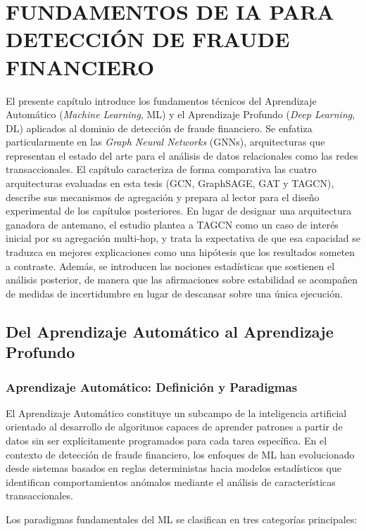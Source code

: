 \chapter{FUNDAMENTOS DE IA PARA DETECCIÓN DE FRAUDE FINANCIERO}

El presente capítulo introduce los fundamentos técnicos del Aprendizaje Automático (\textit{Machine Learning}, ML) y el Aprendizaje Profundo (\textit{Deep Learning}, DL) aplicados al dominio de detección de fraude financiero. Se enfatiza particularmente en las \textit{Graph Neural Networks} (GNNs), arquitecturas que representan el estado del arte para el análisis de datos relacionales como las redes transaccionales. El capítulo caracteriza de forma comparativa las cuatro arquitecturas evaluadas en esta tesis (GCN, GraphSAGE, GAT y TAGCN), describe sus mecanismos de agregación y prepara al lector para el diseño experimental de los capítulos posteriores. En lugar de designar una arquitectura ganadora de antemano, el estudio plantea a TAGCN como un caso de interés inicial por su agregación multi-hop, y trata la expectativa de que esa capacidad se traduzca en mejores explicaciones como una hipótesis que los resultados someten a contraste. Además, se introducen las nociones estadísticas que sostienen el análisis posterior, de manera que las afirmaciones sobre estabilidad se acompañen de medidas de incertidumbre en lugar de descansar sobre una única ejecución.

\section{Del Aprendizaje Automático al Aprendizaje Profundo}

\subsection{Aprendizaje Automático: Definición y Paradigmas}

El Aprendizaje Automático constituye un subcampo de la inteligencia artificial orientado al desarrollo de algoritmos capaces de aprender patrones a partir de datos sin ser explícitamente programados para cada tarea específica. En el contexto de detección de fraude financiero, los enfoques de ML han evolucionado desde sistemas basados en reglas deterministas hacia modelos estadísticos que identifican comportamientos anómalos mediante el análisis de características transaccionales.

Los paradigmas fundamentales del ML se clasifican en tres categorías principales:

